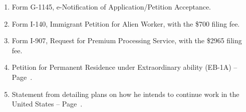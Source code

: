 
\begin{enumerate}[nosep]
    \item Form G-1145, e-Notification of Application/Petition Acceptance.
    \item Form I-140, Immigrant Petition for Alien Worker, with the \$700 filing fee.
    \item Form I-907, Request for Premium Processing Service, with the \$2965 filing fee.
    \item Petition for Permanent Residence under Extraordinary ability (EB-1A) -- Page~\pageref{Body}.
    \item Statement from \mrl detailing plans on how he intends to continue work in the United States -- Page~\pageref{WorkPlan}.
\end{enumerate}

\pagebreak
